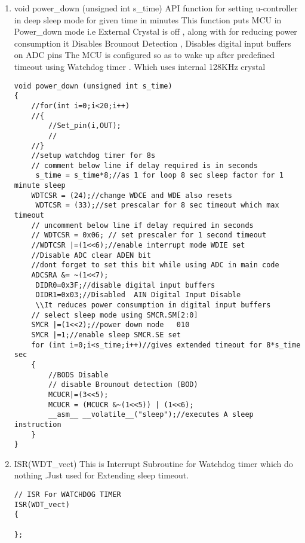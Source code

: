 \documentclass{article}
\begin{document}
\begin{itemize}
\begin{enumerate}
\item void power\_down (unsigned int s\_time)
\newline API function for setting u-controller in deep sleep mode for given time in minutes
\newline This function puts MCU in Power\_down mode  i.e External Crystal is off , along with for reducing power consumption it Disables Brounout Detection , Disables digital input buffers on ADC pins
\newline The MCU is configured so as to wake up after predefined timeout using Watchdog timer . Which uses internal 128KHz crystal
\begin{lstlisting}
void power_down (unsigned int s_time)
{
	//for(int i=0;i<20;i++)
	//{
		//Set_pin(i,OUT);
		//
	//}
	//setup watchdog timer for 8s
	// comment below line if delay required is in seconds
	 s_time = s_time*8;//as 1 for loop 8 sec sleep factor for 1 minute sleep
	WDTCSR = (24);//change WDCE and WDE also resets
	 WDTCSR = (33);//set prescalar for 8 sec timeout which max timeout
    // uncomment below line if delay required in seconds
	// WDTCSR = 0x06; // set prescaler for 1 second timeout
	//WDTCSR |=(1<<6);//enable interrupt mode WDIE set
	//Disable ADC clear ADEN bit 
    //dont forget to set this bit while using ADC in main code
    ADCSRA &= ~(1<<7);
	 DIDR0=0x3F;//disable digital input buffers
	 DIDR1=0x03;//Disabled  AIN Digital Input Disable
     \\It reduces power consumption in digital input buffers
	// select sleep mode using SMCR.SM[2:0]
	SMCR |=(1<<2);//power down mode   010
	SMCR |=1;//enable sleep SMCR.SE set
	for (int i=0;i<s_time;i++)//gives extended timeout for 8*s_time sec
	{
		//BODS Disable
		// disable Brounout detection (BOD)
		MCUCR|=(3<<5);
		MCUCR = (MCUCR &~(1<<5)) | (1<<6);
		__asm__ __volatile__("sleep");//executes A sleep instruction
	}
}
\end{lstlisting}
\item ISR(WDT\_vect)
\newline This is Interrupt Subroutine for Watchdog timer which do nothing .Just used for Extending sleep timeout. 
\begin{lstlisting}
// ISR For WATCHDOG TIMER
ISR(WDT_vect)
{
	
};
\end{lstlisting}


\end{enumerate}
\end{itemize}
\end{document}
